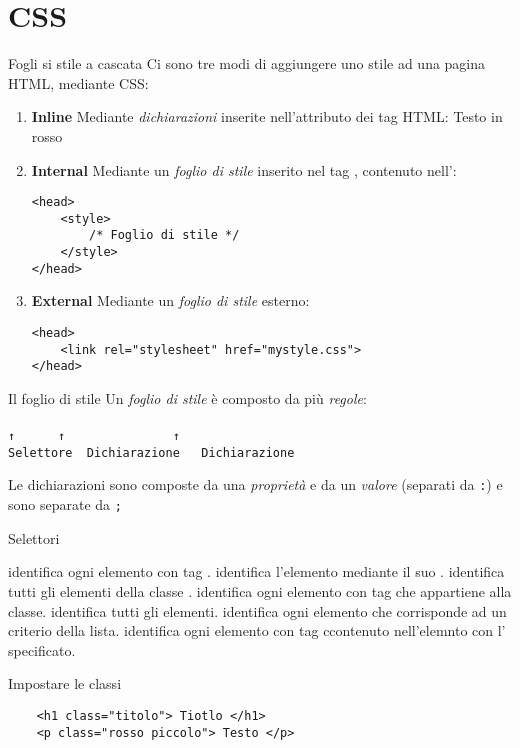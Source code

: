 \section{CSS}
\begin{frame}[fragile]{Fogli si stile a cascata}\transfade\centering
  Ci sono tre modi di aggiungere uno stile ad una pagina HTML, mediante CSS:
  \begin{enumerate}[<+(1)->]
    \item \textbf{Inline} Mediante \emph{dichiarazioni} inserite nell'attributo  dei tag HTML:
     {\color{red}Testo in rosso}
    \item \textbf{Internal} Mediante un \emph{foglio di stile} inserito nel tag , contenuto nell':
    \begin{verbatim}
<head>
    <style>
        /* Foglio di stile */
    </style>
</head>
    \end{verbatim}
    \item \textbf{External} Mediante un \emph{foglio di stile} esterno:
    \begin{verbatim}
<head>
    <link rel="stylesheet" href="mystyle.css">
</head>
    \end{verbatim}
  \end{enumerate}
\end{frame}

\begin{frame}[fragile]{Il foglio di stile}\transfade\centering
  Un \emph{foglio di stile} è composto da più \emph{regole}:\\\medskip
     \\
      \texttt{↑~~~~~~↑~~~~~~~~~~~~~~~↑~~~~~~}\\
\texttt{Selettore~~Dichiarazione~~~Dichiarazione~~}\par\bigskip
  Le dichiarazioni sono composte da una \emph{proprietà} e da un \emph{valore} (separati da \texttt{:}) e sono separate da \texttt{;}\\
\end{frame}

\begin{frame}{Selettori}\transfade\centering
  \begin{description}[<+->]
    \itemtt[p] identifica ogni elemento con tag .
    \itemtt[\#id] identifica l'elemento mediante il suo .
    \itemtt[.class] identifica tutti gli elementi della classe .
    \itemtt[p.class] identifica ogni elemento con tag  che appartiene alla classe.
    \itemtt[*] identifica tutti gli elementi.
     identifica ogni elemento che corrisponde ad un criterio della lista.
    \itemtt[\#id p] identifica ogni elemento con tag  ccontenuto nell'elemnto con l' specificato.
  \end{description}
\end{frame}

\begin{frame}[fragile]{Impostare le classi}\transfade\centering
  \begin{verbatim}
    <h1 class="titolo"> Tiotlo </h1>
    <p class="rosso piccolo"> Testo </p>
  \end{verbatim}
\end{frame}